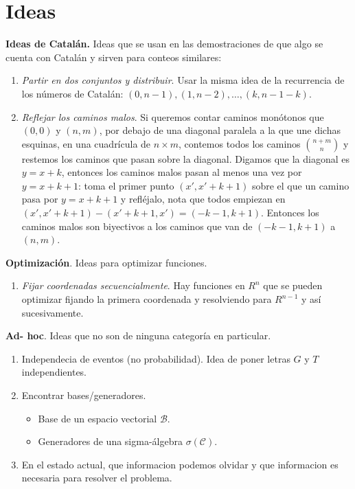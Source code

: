\section{Ideas}

\textbf{Ideas de Catalán.} Ideas que se usan en las demostraciones de que algo se cuenta con Catalán y sirven para conteos similares:
\begin{enumerate}[1.]
    \item \textit{Partir en dos conjuntos y distribuir}. Usar la misma idea de la recurrencia de los números de Catalán: $(0, n - 1), (1, n - 2), \dots, (k, n - 1 - k)$.
    \item \textit{Reflejar los caminos malos}. Si queremos contar caminos monótonos que $(0, 0)$ y $(n, m)$, por debajo de una diagonal paralela a la que une dichas esquinas, en una cuadrícula de $n \times m$, contemos todos los caminos $\binom{n + m}{n}$ y restemos los caminos que pasan sobre la diagonal. Digamos que la diagonal es $y = x + k$, entonces los caminos malos pasan al menos una vez por $y = x + k + 1$: toma el primer punto $(x', x' + k + 1)$ sobre el que un camino pasa por $y = x + k + 1$ y refléjalo, nota que todos empiezan en $(x', x' + k + 1) - (x' + k + 1, x') = (- k - 1, k + 1)$. Entonces los caminos malos son biyectivos a los caminos que van de $(- k - 1, k + 1)$ a $(n, m)$.
\end{enumerate}

\textbf{Optimización}. Ideas para optimizar funciones.
\begin{enumerate}[1.]
    \item \textit{Fijar coordenadas secuencialmente}. Hay funciones en $R^n$ que se pueden optimizar fijando la primera coordenada y resolviendo para $R^{n - 1}$ y así sucesivamente.
\end{enumerate}


\textbf{Ad- hoc}. Ideas que no son de ninguna categoría en particular.
\begin{enumerate}[1.]
    \item Independecia de eventos (no probabilidad). Idea de poner letras $G$ y $T$ independientes.
    \item Encontrar bases/generadores. 
    \begin{itemize}
        \item Base de un espacio vectorial $\mathcal{B}$.
        \item Generadores de una sigma-álgebra $\sigma(\mathcal{C})$.
    \end{itemize}
    \item En el estado actual, que informacion podemos olvidar y que informacion es necesaria para resolver el problema.
\end{enumerate}